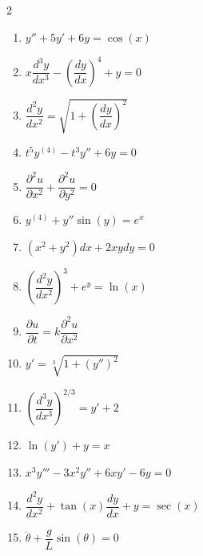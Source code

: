 \documentclass[a4paper,11pt]{article}
\begin{document}
\begin{multicols}{2}
\begin{enumerate}[itemsep=0.4cm]
    \item $y'' + 5y' + 6y = \cos(x)$
    \item $x \dfrac{d^3 y}{dx^3} - \left(\dfrac{dy}{dx}\right)^4 + y = 0$
    \item $\dfrac{d^2 y}{dx^2} = \sqrt{1 + \left(\dfrac{dy}{dx}\right)^2}$
    \item $t^5 y^{(4)} - t^3 y'' + 6y = 0$
    \item $\dfrac{\partial^2 u}{\partial x^2} + \dfrac{\partial^2 u}{\partial y^2} = 0$
    \item $y^{(4)} + y'' \sin(y) = e^x$
    \item $(x^2 + y^2)dx + 2xydy = 0$
    \item $\left(\dfrac{d^2 y}{dx^2}\right)^3 + e^y = \ln(x)$
    \item $\dfrac{\partial u}{\partial t} = k \dfrac{\partial^2 u}{\partial x^2}$
    \item $y' = \sqrt[3]{1 + (y'')^2}$
    \item $\left(\dfrac{d^3 y}{dx^3}\right)^{2/3} = y' + 2$
    \item $\ln(y') + y = x$
    \item $x^3 y''' - 3x^2 y'' + 6xy' - 6y = 0$
    \item $\dfrac{d^2 y}{dx^2} + \tan(x) \dfrac{dy}{dx} + y = \sec(x)$
    \item $\ddot{\theta} + \dfrac{g}{L} \sin(\theta) = 0$
\end{enumerate}
\end{multicols}
\end{document}
